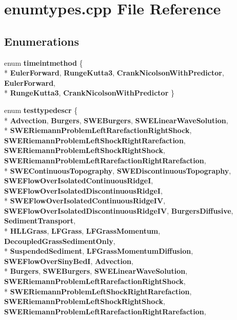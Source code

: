 \section{enumtypes.\-cpp File Reference}
\label{enumtypes_8cpp}
\subsection*{Enumerations}
\begin{DoxyCompactItemize}
\item 
enum {\bf timeintmethod} \{ \\*
{\bf Euler\-Forward}, 
{\bf Runge\-Kutta3}, 
{\bf Crank\-Nicolson\-With\-Predictor}, 
{\bf Euler\-Forward}, 
\\*
{\bf Runge\-Kutta3}, 
{\bf Crank\-Nicolson\-With\-Predictor}
 \}
\item 
enum {\bf testtypedescr} \{ \\*
{\bf Advection}, 
{\bf Burgers}, 
{\bf S\-W\-E\-Burgers}, 
{\bf S\-W\-E\-Linear\-Wave\-Solution}, 
\\*
{\bf S\-W\-E\-Riemann\-Problem\-Left\-Rarefaction\-Right\-Shock}, 
{\bf S\-W\-E\-Riemann\-Problem\-Left\-Shock\-Right\-Rarefaction}, 
{\bf S\-W\-E\-Riemann\-Problem\-Left\-Shock\-Right\-Shock}, 
{\bf S\-W\-E\-Riemann\-Problem\-Left\-Rarefaction\-Right\-Rarefaction}, 
\\*
{\bf S\-W\-E\-Continuous\-Topography}, 
{\bf S\-W\-E\-Discontinuous\-Topography}, 
{\bf S\-W\-E\-Flow\-Over\-Isolated\-Continuous\-Ridge\-I}, 
{\bf S\-W\-E\-Flow\-Over\-Isolated\-Discontinuous\-Ridge\-I}, 
\\*
{\bf S\-W\-E\-Flow\-Over\-Isolated\-Continuous\-Ridge\-I\-V}, 
{\bf S\-W\-E\-Flow\-Over\-Isolated\-Discontinuous\-Ridge\-I\-V}, 
{\bf Burgers\-Diffusive}, 
{\bf Sediment\-Transport}, 
\\*
{\bf H\-L\-L\-Grass}, 
{\bf L\-F\-Grass}, 
{\bf L\-F\-Grass\-Momentum}, 
{\bf Decoupled\-Grass\-Sediment\-Only}, 
\\*
{\bf Suspended\-Sediment}, 
{\bf L\-F\-Grass\-Momentum\-Diffusion}, 
{\bf S\-W\-E\-Flow\-Over\-Siny\-Bed\-I}, 
{\bf Advection}, 
\\*
{\bf Burgers}, 
{\bf S\-W\-E\-Burgers}, 
{\bf S\-W\-E\-Linear\-Wave\-Solution}, 
{\bf S\-W\-E\-Riemann\-Problem\-Left\-Rarefaction\-Right\-Shock}, 
\\*
{\bf S\-W\-E\-Riemann\-Problem\-Left\-Shock\-Right\-Rarefaction}, 
{\bf S\-W\-E\-Riemann\-Problem\-Left\-Shock\-Right\-Shock}, 
{\bf S\-W\-E\-Riemann\-Problem\-Left\-Rarefaction\-Right\-Rarefaction}, 

\end{DoxyCompactItemize}

